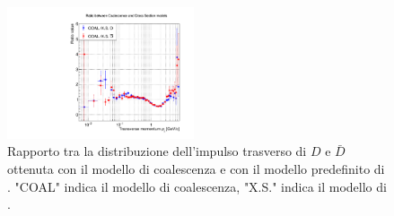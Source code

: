 \begin{figure}[htp]
    \centering
    \includegraphics[width=0.49\textwidth]{image/3-risultati/analyse/A/ratio_CXS.pdf}
    \caption{Rapporto tra la distribuzione dell'impulso trasverso di $D$ e $\bar D$ ottenuta con il modello di coalescenza e con il modello predefinito di \emph{\pythiaa}. "COAL" indica il modello di coalescenza, "X.S." indica il modello di \pythiaa{}.}
    \label{fig:A_vs_E}
\end{figure}